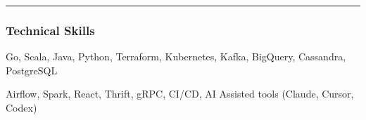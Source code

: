 \documentclass[10pt,letterpaper]{article}
\newenvironment{indentsection}[1]%
	{\begin{list}{}%
			{\setlength{\leftmargin}{#1}}%
			\item[]%
		}
		{\end{list}}
\begin{document}
		\vspace{0.4em}
		\hrule
		\vspace{-0.5em}

		\subsubsection*{Technical Skills}
		\begin{indentsection}{\parindent/2}
			\begin{description*}
				\item[Core Technologies:]
				Go, Scala, Java, Python, Terraform, Kubernetes, Kafka, BigQuery, Cassandra, PostgreSQL
				\item[Additional Technologies:]
				Airflow, Spark, React, Thrift, gRPC, CI/CD, AI Assisted tools (Claude, Cursor, Codex)
			\end{description*}
		\end{indentsection}

	
\end{document}
